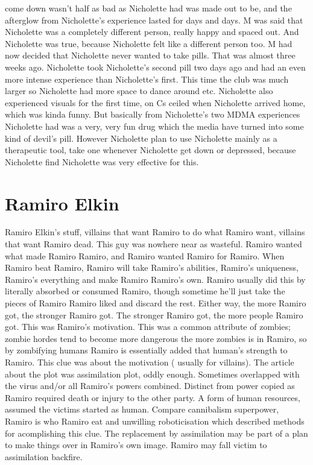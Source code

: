 \documentclass[12pt]{book}
\begin{document}
come down wasn't half as bad as Nicholette had was made out to be, and the afterglow from Nicholette's experience lasted for days and days. M was said that Nicholette was a completely different person, really happy and spaced out. And Nicholette was true, because Nicholette felt like a different person too. M had now decided that Nicholette never wanted to take pills. That was almost three weeks ago. Nicholette took Nicholette's second pill two days ago and had an even more intense experience than Nicholette's first. This time the club was much larger so Nicholette had more space to dance around etc. Nicholette also experienced visuals for the first time, on Cs ceiled when Nicholette arrived home, which was kinda funny. But basically from Nicholette's two MDMA experiences Nicholette had was a very, very fun drug which the media have turned into some kind of devil's pill. However Nicholette plan to use Nicholette mainly as a therapeutic tool, take one whenever Nicholette get down or depressed, because Nicholette find Nicholette was very effective for this.



\chapter{Ramiro Elkin}

Ramiro Elkin's stuff, villains that want Ramiro to do what Ramiro want, villains that want Ramiro dead. This guy was nowhere near as wasteful. Ramiro wanted what made Ramiro Ramiro, and Ramiro wanted Ramiro for Ramiro. When Ramiro beat Ramiro, Ramiro will take Ramiro's abilities, Ramiro's uniqueness, Ramiro's everything and make Ramiro Ramiro's own. Ramiro usually did this by literally absorbed or consumed Ramiro, though sometime he'll just take the pieces of Ramiro Ramiro liked and discard the rest. Either way, the more Ramiro got, the stronger Ramiro got. The stronger Ramiro got, the more people Ramiro got. This was Ramiro's motivation. This was a common attribute of zombies; zombie hordes tend to become more dangerous the more zombies is in Ramiro, so by zombifying humans Ramiro is essentially added that human's strength to Ramiro. This clue was about the motivation ( usually for villains). The article about the plot was assimilation plot, oddly enough. Sometimes overlapped with the virus and/or all Ramiro's powers combined. Distinct from power copied as Ramiro required death or injury to the other party. A form of human resources, assumed the victims started as human. Compare cannibalism superpower, Ramiro is who Ramiro eat and unwilling roboticisation which described methods for acomplishing this clue. The replacement by assimilation may be part of a plan to make things over in Ramiro's own image. Ramiro may fall victim to assimilation backfire.
\end{document}
